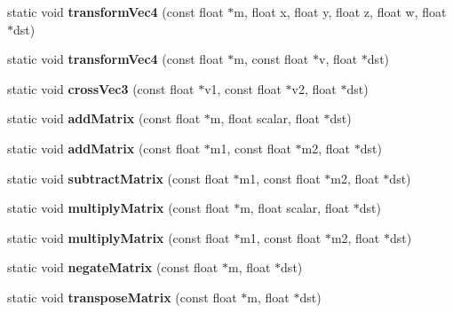 \begin{DoxyCompactItemize}
static void {\bfseries transform\+Vec4} (const float $\ast$m, float x, float y, float z, float w, float $\ast$dst)
\item 
\mbox{\label{classMathUtilNeon_affbf5759bfc11bafe73e5cad42a16b32}} 
static void {\bfseries transform\+Vec4} (const float $\ast$m, const float $\ast$v, float $\ast$dst)
\item 
\mbox{\label{classMathUtilNeon_a0822e4d28803a6a9f3f02fe305da5d3b}} 
static void {\bfseries cross\+Vec3} (const float $\ast$v1, const float $\ast$v2, float $\ast$dst)
\item 
\mbox{\label{classMathUtilNeon_a6bb4b6c7fd85cb50e17a10c4d6e4336f}} 
static void {\bfseries add\+Matrix} (const float $\ast$m, float scalar, float $\ast$dst)
\item 
\mbox{\label{classMathUtilNeon_a4cefe253e16ae1a8da9272e6c395e50b}} 
static void {\bfseries add\+Matrix} (const float $\ast$m1, const float $\ast$m2, float $\ast$dst)
\item 
\mbox{\label{classMathUtilNeon_abb33e4d368e34f920656ae8551d0fb37}} 
static void {\bfseries subtract\+Matrix} (const float $\ast$m1, const float $\ast$m2, float $\ast$dst)
\item 
\mbox{\label{classMathUtilNeon_a1f3e031a8b53e173324cfc4b36c43a57}} 
static void {\bfseries multiply\+Matrix} (const float $\ast$m, float scalar, float $\ast$dst)
\item 
\mbox{\label{classMathUtilNeon_a9cdd415e368030841aaa8e8d531c174a}} 
static void {\bfseries multiply\+Matrix} (const float $\ast$m1, const float $\ast$m2, float $\ast$dst)
\item 
\mbox{\label{classMathUtilNeon_a859fc25b3b8b66a53e354f4305ab1b1e}} 
static void {\bfseries negate\+Matrix} (const float $\ast$m, float $\ast$dst)
\item 
\mbox{\label{classMathUtilNeon_a24f1a96317dd8670f77f82793500dbab}} 
static void {\bfseries transpose\+Matrix} (const float $\ast$m, float $\ast$dst)
\item 

\end{DoxyCompactItemize}
